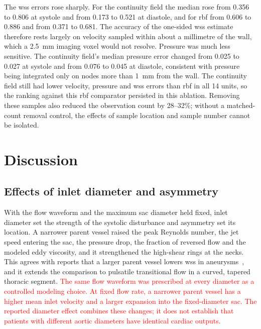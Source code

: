 \documentclass[12pt,a4paper]{article}
\newcommand{\cfdrevision}[1]{\textcolor{red}{#1}}
\newcommand{\WSS}{\ac{wss}\xspace}
\newcommand{\RBF}{\ac{rbf}\xspace}
\theoremstyle{definition}
\numberwithin{equation}{section}
\begin{document}
The \WSS errors rose sharply. For the continuity field the median rose from 0.356 to 0.806 at systole and from 0.173 to 0.521 at diastole, and for \RBF from 0.606 to 0.886 and from 0.371 to 0.681. The accuracy of the one-sided \WSS estimate therefore rests largely on velocity sampled within about a millimetre of the wall, which a 2.5~mm imaging voxel would not resolve. Pressure was much less sensitive. The continuity field's median pressure error changed from 0.025 to 0.027 at systole and from 0.076 to 0.045 at diastole, consistent with pressure being integrated only on nodes more than 1~mm from the wall. The continuity field still had lower velocity, pressure and \WSS errors than \RBF in all 14 units, so the ranking against this \RBF comparator persisted in this ablation. Removing these samples also reduced the observation count by 28--32\%; without a matched-count removal control, the effects of sample location and sample number cannot be isolated.




\section{Discussion}
\label{sec:discussion}
\subsection{Effects of inlet diameter and asymmetry}
With the flow waveform and the maximum sac diameter held fixed, inlet diameter set the strength of the systolic disturbance and asymmetry set its location. A narrower parent vessel raised the peak Reynolds number, the jet speed entering the sac, the pressure drop, the fraction of reversed flow and the modeled eddy viscosity, and it strengthened the high-shear rings at the necks. This agrees with reports that a larger parent vessel lowers \WSS in aneurysms~\cite{fattahi2023influence}, and it extends the comparison to pulsatile transitional flow in a curved, tapered thoracic segment. \cfdrevision{The same flow waveform was prescribed at every diameter as a controlled modeling choice. At fixed flow rate, a narrower parent vessel has a higher mean inlet velocity and a larger expansion into the fixed-diameter sac. The reported diameter effect combines these changes; it does not establish that patients with different aortic diameters have identical cardiac outputs.}
\end{document}
